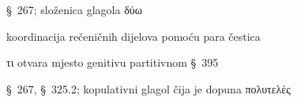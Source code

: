 

\begin{description}[noitemsep]
\item[ἐνεδύσατο] §~267; složenica glagola δύω
\item[ἐνεδύσατο μὲν\dots\ κἀκεῖνο δὲ] koordinacija rečeničnih dijelova pomoću para čestica
\item[τῶν ἐπιτυχόντων] τι otvara mjesto genitivu partitivnom §~395
\item[ἔδοξε] §~267, §~325.2; kopulativni glagol čija je dopuna πολυτελὲς
\end{description}



